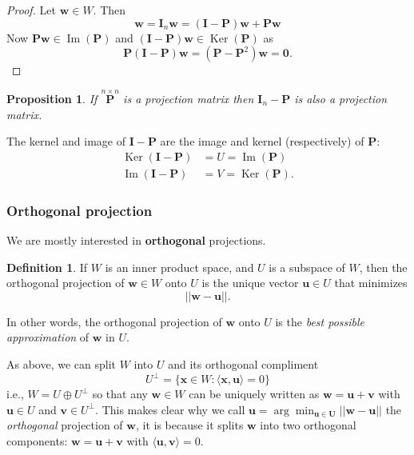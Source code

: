\documentclass[
]{book}
\newtheorem{proposition}{Proposition}[chapter]
\theoremstyle{definition}
\newtheorem{definition}{Definition}[chapter]
\theoremstyle{definition}
\theoremstyle{definition}
\theoremstyle{definition}
\theoremstyle{remark}
\begin{document}
\begin{proof}
Let \(\mathbf w\in W\). Then
\[\mathbf w= \mathbf I_n \mathbf w=(\mathbf I-\mathbf P)\mathbf w+ \mathbf P\mathbf w\]
Now \(\mathbf P\mathbf w\in \operatorname{Im}(\mathbf P)\) and \((\mathbf I-\mathbf P)\mathbf w\in \operatorname{Ker}(\mathbf P)\) as
\[\mathbf P(\mathbf I-\mathbf P)\mathbf w= (\mathbf P-\mathbf P^2)\mathbf w={\boldsymbol 0}.\]
\end{proof}

\begin{proposition}
\protect\hypertarget{prp:projIP}{}\label{prp:projIP}If \(\stackrel{n \times n}{\mathbf P}\) is a projection matrix then \({\mathbf I}_n - \mathbf P\) is also
a projection matrix.
\end{proposition}

The kernel and image of \(\mathbf I-\mathbf P\) are the image and kernel (respectively) of \(\mathbf P\):
\begin{align*}
\operatorname{Ker}(\mathbf I-\mathbf P) &= U=\operatorname{Im}(\mathbf P)\\
\operatorname{Im}(\mathbf I-\mathbf P) &= V=\operatorname{Ker}(\mathbf P).
\end{align*}

\hypertarget{orthogproj}{%
\subsubsection{Orthogonal projection}\label{orthogproj}}

We are mostly interested in \textbf{orthogonal} projections.

\begin{definition}
\protect\hypertarget{def:orthogproj}{}\label{def:orthogproj}If \(W\) is an inner product space, and \(U\) is a subspace of \(W\), then the orthogonal projection of \(\mathbf w\in W\) onto \(U\) is the unique vector \(\mathbf u\in U\) that minimizes
\[||\mathbf w-\mathbf u||.\]
\end{definition}

In other words, the orthogonal projection of \(\mathbf w\) onto \(U\) is the \emph{best possible approximation} of \(\mathbf w\) in \(U\).

As above, we can split \(W\) into \(U\) and its orthogonal compliment
\[U^\perp = \{\mathbf x\in W: \langle \mathbf x,\mathbf u\rangle = 0\}\]
i.e., \(W=U \oplus U^\perp\) so that any \(\mathbf w\in W\) can be uniquely written as
\(\mathbf w=\mathbf u+\mathbf v\) with \(\mathbf u\in U\) and \(\mathbf v\in U^\perp\). This makes clear why we call \(\mathbf u= \arg \min_{\mathbf u\in \mathbf U} ||\mathbf w-\mathbf u||\) the \emph{orthogonal} projection of \(\mathbf w\), it is because it splits \(\mathbf w\) into two orthogonal components: \(\mathbf w= \mathbf u+\mathbf v\) with \(\langle \mathbf u, \mathbf v\rangle=0\).
\end{document}
